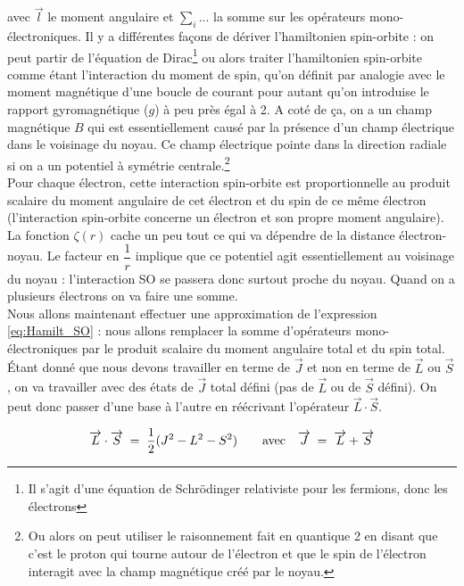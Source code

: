avec $\overrightarrow{l}$ le moment angulaire et $\sum_i...$ la somme sur les opérateurs mono-électroniques. Il y a différentes façons de dériver l’hamiltonien spin-orbite : on peut partir de l’équation de Dirac\footnote{Il s'agit d'une équation de Schrödinger relativiste pour les fermions, donc les électrons} ou alors traiter l’hamiltonien spin-orbite comme étant l’interaction du moment de spin, qu’on définit par analogie avec le moment magnétique d’une boucle de courant pour autant qu’on introduise le rapport gyromagnétique ($g$) à peu près égal à 2. A coté de ça, on a un champ magnétique $B$ qui est essentiellement causé par la présence d’un champ électrique dans le voisinage du noyau. Ce champ électrique pointe dans la direction radiale si on a un potentiel à symétrie centrale.\footnote{Ou alors on peut utiliser le raisonnement fait en quantique 2 en disant que c'est le proton qui tourne autour de l'électron et que le spin de l'électron interagit avec la champ magnétique créé par le noyau.}\\

Pour chaque électron, cette interaction spin-orbite est proportionnelle au produit scalaire du moment angulaire de cet électron et du spin de ce même électron (l'interaction spin-orbite concerne un électron et son propre moment angulaire). La fonction $\zeta(r)$ cache un peu tout ce qui va dépendre de la distance électron-noyau. Le facteur en $\dfrac{1}{r}$ implique que ce potentiel agit essentiellement au voisinage du noyau : l'interaction SO se passera donc surtout proche du noyau. Quand on a plusieurs électrons on va faire une somme.\\

Nous allons maintenant effectuer une approximation de l'expression \eqref{eq:Hamilt_SO} : nous allons remplacer la somme d’opérateurs mono-électroniques par le produit scalaire du moment angulaire total et du spin total. Étant donné que nous devons travailler en terme de $\overrightarrow{J}$ et non en terme de $\overrightarrow{L}$ ou $\overrightarrow{S}$, on va travailler avec des états de $\overrightarrow{J}$ total défini (pas de $\overrightarrow{L}$ ou de $\overrightarrow{S}$ défini). On peut donc passer d’une base à l’autre en réécrivant l’opérateur $\overrightarrow{L}\cdot\overrightarrow{S}$.

\begin{equation}
    \overrightarrow{L}\cdot\overrightarrow{S} \; = \;  \dfrac{1}{2}(J^2-L^2-S^2) \qquad \mathrm{avec} \quad \overrightarrow{J} \; = \;  \overrightarrow{L}+\overrightarrow{S}
    \label{eq:JLS}
\end{equation}


